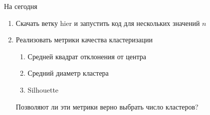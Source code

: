 \documentclass[10pt,a4paper]{beamer}
\begin{document}

\begin{frame}{На сегодня}

\begin{enumerate}
\item Скачать ветку hier и запустить код для нескольких значений $n$
\item Реализовать метрики качества кластеризации
\begin{enumerate}
\item Средней квадрат отклонения от центра
\item Средний диаметр кластера
\item Silhouette
\end{enumerate}
Позволяют ли эти метрики верно выбрать число кластеров?
\end{enumerate}

\end{frame}

\end{document}
